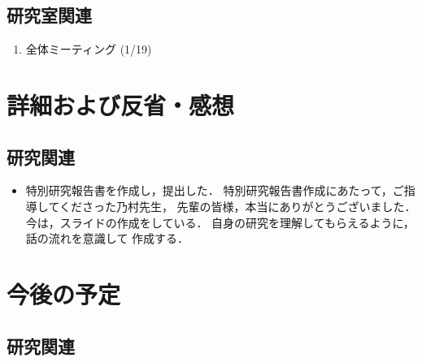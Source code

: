 \documentclass[fleqn, 14pt]{extarticle}
\begin{document}
\subsection{研究室関連}
\label{sec-2-2}
\begin{enumerate}
\item 全体ミーティング 
\hfill
\label{enum-lab1}
(1/19)
\end{enumerate}


\section{詳細および反省・感想}
\label{sec-3}
\subsection{研究関連}
\label{sec-3-1}

\begin{itemize}
\item[(\ref{enum-1-E})]
    特別研究報告書を作成し，提出した．
    特別研究報告書作成にあたって，ご指導してくださった乃村先生，
    先輩の皆様，本当にありがとうございました．
    今は，スライドの作成をしている．
    自身の研究を理解してもらえるように，話の流れを意識して
    作成する．
    
\end{itemize}

\section{今後の予定}
\label{sec-4}
\subsection{研究関連}
\label{sec-4-1}
\end{document}

